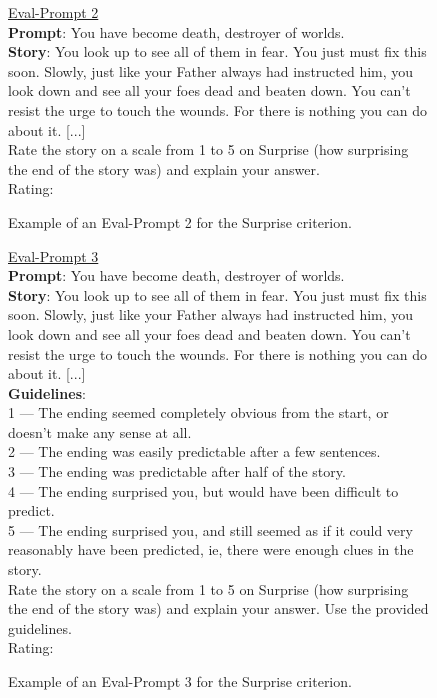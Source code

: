 \begin{figure}[h!]
    \begin{framed}
    \underline{Eval-Prompt 2}\\
    
    \noindent \textbf{Prompt}: You have become death, destroyer of worlds.\\
    
    \noindent \textbf{Story}: You look up to see all of them in fear. You just must fix this soon. Slowly, just like your Father always had instructed him, you look down and see all your foes dead and beaten down. You can't resist the urge to touch the wounds. For there is nothing you can do about it. [...]\\
    
    Rate the story on a scale from 1 to 5 on Surprise (how surprising the end of the story was) and explain your answer.\\
    
    Rating:
    \end{framed}
    \caption{Example of an Eval-Prompt 2 for the Surprise criterion.}
    \label{fig:eval_prompt_2}
\end{figure}

\begin{figure}[h!]
    \begin{framed}
    \underline{Eval-Prompt 3}\\
    
    \noindent \textbf{Prompt}: You have become death, destroyer of worlds.\\
    
    \noindent \textbf{Story}: You look up to see all of them in fear. You just must fix this soon. Slowly, just like your Father always had instructed him, you look down and see all your foes dead and beaten down. You can't resist the urge to touch the wounds. For there is nothing you can do about it. [...]\\
    
    \noindent \textbf{Guidelines}:\\
    1 — The ending seemed completely obvious from the start, or doesn't make any sense at all.\\
    2 — The ending was easily predictable after a few sentences.\\
    3 — The ending was predictable after half of the story.\\
    4 — The ending surprised you, but would have been difficult to predict.\\
    5 — The ending surprised you, and still seemed as if it could very reasonably have been predicted, ie, there were enough clues in the story.\\
    
    Rate the story on a scale from 1 to 5 on Surprise (how surprising the end of the story was) and explain your answer. Use the provided guidelines.\\
    
    Rating:
    \end{framed}
    \caption{Example of an Eval-Prompt 3 for the Surprise criterion.}
    \label{fig:eval_prompt_3}
\end{figure}


